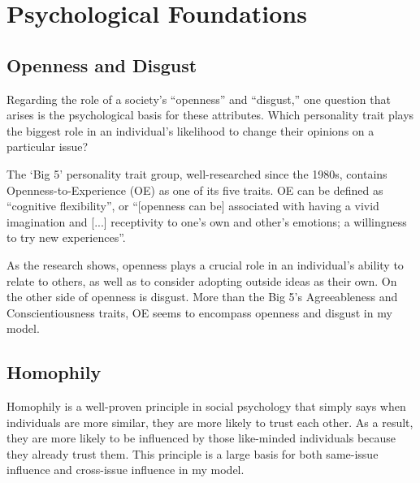 \section{Psychological Foundations}

\subsection{Openness and Disgust}
Regarding the role of a society's ``openness'' and ``disgust,'' one question that arises is the
psychological basis for these attributes. Which personality trait plays the
biggest role in an individual's likelihood to change their opinions on a
particular issue? 

The `Big 5' personality trait group\cite{john_big-five_1999},
well-researched since the 1980s, contains Openness-to-Experience (OE) as one of
its five traits. OE can be defined as ``cognitive
flexibility''\cite{deyoung_sources_2005}, or ``[openness can be] associated
with having a vivid imagination and [...] receptivity to one's own and other's
emotions; a willingness to try new experiences''\cite{furnham_childhood_2016}.

As the research shows, openness plays a crucial role in an individual's ability
to relate to others, as well as to consider adopting outside ideas as their
own. On the other side of openness is disgust. More than the Big 5's Agreeableness and Conscientiousness traits, OE seems
to encompass openness and disgust in my model.

\subsection{Homophily}
Homophily is a well-proven principle in social psychology that simply says when individuals are more similar, they are more likely to trust each other\cite{mcpherson_birds_2001}. As a result, they are more likely to be influenced by those like-minded individuals because they already trust them. This principle is a large basis for both same-issue influence and cross-issue influence in my model. 